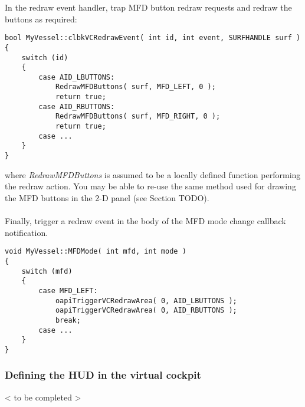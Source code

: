 \documentclass[Orbiter Developer Manual.tex]{subfiles}
\begin{document}
\noindent
In the redraw event handler, trap MFD button redraw requests and redraw the buttons as required:

\begin{lstlisting}
bool MyVessel::clbkVCRedrawEvent( int id, int event, SURFHANDLE surf )
{
	switch (id)
	{
		case AID_LBUTTONS:
			RedrawMFDButtons( surf, MFD_LEFT, 0 );
			return true;
		case AID_RBUTTONS:
			RedrawMFDButtons( surf, MFD_RIGHT, 0 );
			return true;
		case ...
	}
}
\end{lstlisting}

\noindent
where \textit{RedrawMFDButtons} is assumed to be a locally defined function performing the redraw action. You may be able to re-use the same method used for drawing the MFD buttons in the 2-D panel (see Section TODO).\\
\\
Finally, trigger a redraw event in the body of the MFD mode change callback notification.

\begin{lstlisting}
void MyVessel::MFDMode( int mfd, int mode )
{
	switch (mfd)
	{
		case MFD_LEFT:
			oapiTriggerVCRedrawArea( 0, AID_LBUTTONS );
			oapiTriggerVCRedrawArea( 0, AID_RBUTTONS );
			break;
		case ...
	}
}
\end{lstlisting}


\subsubsection{Defining the HUD in the virtual cockpit}
< to be completed >
\end{document}
